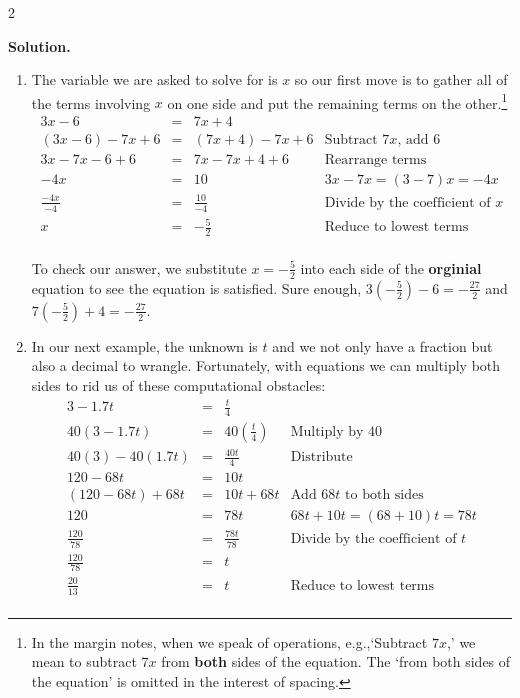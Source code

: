 \documentclass{ximera}
\begin{document}
\begin{example}
\begin{multicols}{2}
\end{multicols}

{\bf Solution.} 

\begin{enumerate}

\item  The variable we are asked to solve for is $x$ so our first move is to gather all of the terms involving $x$ on one side and put the remaining terms on the other.\footnote{In the margin notes, when we speak of operations, e.g.,`Subtract $7x$,' we mean to subtract $7x$ from \textbf{both} sides of the equation.  The `from both sides of the equation' is omitted in the interest of spacing.}\[ \begin{array}{rclr} 3x - 6 &  = & 7x + 4 & \\
                       (3x-6) - 7x + 6 &  = & (7x+4) -7x +6 &  \text{Subtract $7x$, add $6$} \\
											3x - 7x - 6 + 6 & = & 7x - 7x + 4 + 6 & \text{Rearrange terms} \\
											-4x & = & 10 & \text{$3x-7x = (3-7)x = -4x$} \\  
											 \frac{-4x}{-4} & = &  \frac{10}{-4} & \text{Divide by the coefficient of $x$} \\  
											x & = & - \frac{5}{2} & \text{Reduce to lowest terms} \\ \end{array}\]
											
To check our answer, we substitute $x = -\frac{5}{2}$ into each side of the \textbf{orginial} equation to see the equation is satisfied.  Sure enough, $3\left(-\frac{5}{2}\right) - 6 = -\frac{27}{2}$ and $7\left(-\frac{5}{2}\right) + 4 = -\frac{27}{2}$.

\item  In our next example, the unknown is $t$ and we not only have a fraction but also a decimal to wrangle.  Fortunately, with equations we can multiply both sides to rid us of  these computational obstacles:\[ \begin{array}{rclr}  3 - 1.7t  & = &   \frac{t}{4} & \\  
                       40(3 - 1.7t)  & = &  40 \left( \frac{t}{4}\right) & \text{Multiply by $40$} \\ 
											40(3) - 40(1.7t)  & = &   \frac{40 t}{4} & \text{Distribute} \\
											120 - 68t & = & 10 t & \\
											(120 -68t) + 68 t & = & 10t + 68 t & \text{Add $68t$ to both sides} \\
											120 & = & 78 t & \text{$68t + 10t = (68 + 10)t = 78 t$}\\
											 \frac{120}{78} & = &  \frac{78t}{78} &  \text{Divide by the coefficient of $t$}\\ 
											 \frac{120}{78} & = & t & \\  
											 \frac{20}{13} & = & t & \text{Reduce to lowest terms} \\ \end{array}\]
											

\end{enumerate}
\end{example}
\end{document}
